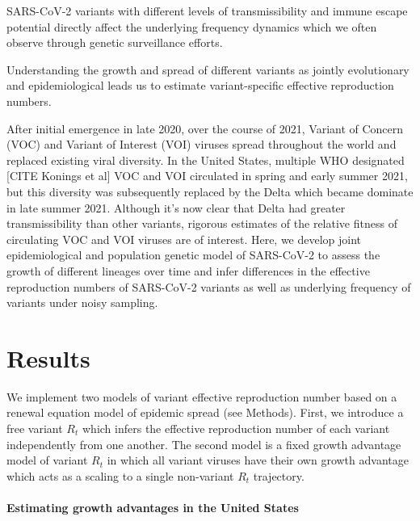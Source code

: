 \documentclass[12pt]{article}
\begin{document}
SARS-CoV-2 variants with different levels of transmissibility and immune escape potential directly affect the underlying frequency dynamics which we often observe through genetic surveillance efforts.

Understanding the growth and spread of different variants as jointly evolutionary and epidemiological leads us to estimate variant-specific effective reproduction numbers.


After initial emergence in late 2020, over the course of 2021, Variant of Concern (VOC) and Variant of Interest (VOI) viruses spread throughout the world and replaced existing viral diversity.
In the United States, multiple WHO designated [CITE Konings et al] VOC and VOI circulated in spring and early summer 2021, but this diversity was subsequently replaced by the Delta which became dominate in late summer 2021.
Although it's now clear that Delta had greater transmissibility than other variants, rigorous estimates of the relative fitness of circulating VOC and VOI viruses are of interest.
Here, we develop joint epidemiological and population genetic model of SARS-CoV-2 to assess the growth of different lineages over time and infer differences in the effective reproduction numbers of SARS-CoV-2 variants as well as underlying frequency of variants under noisy sampling.

\section{Results}


We implement two models of variant effective reproduction number based on a renewal equation model of epidemic spread (see Methods).
First, we introduce a free variant $R_{t}$ which infers the effective reproduction number of each variant independently from one another.
The second model is a fixed growth advantage model of variant $R_{t}$ in which all variant viruses have their own growth advantage which acts as a scaling to a single non-variant $R_{t}$ trajectory.


\paragraph{Estimating growth advantages in the United States}
\end{document}
